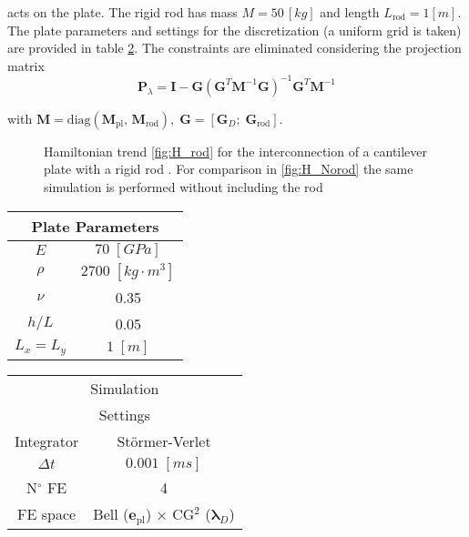 \documentclass[letterpaper, 10 pt, conference]{ieeeconf}
\begin{document}
acts on the plate. The rigid rod has mass $M = 50 \, [kg]$ and length $L_{\text{rod}} = 1 [m]$. The plate parameters and settings for the discretization (a uniform grid is taken) are provided in table \ref{tab:par}. The constraints are eliminated considering the projection matrix \cite{Heiland_red}
\begin{equation} \label{eq:proj}
\bm{P}_{\lambda} = \bm{I} - \bm{G} \left(\bm{G}^T \bm{M}^{-1} \bm{G} \right)^{-1} \bm{G}^T \bm{M}^{-1}
\end{equation}
 
with $\bm{M} = \text{diag}(\bm{M}_{\text{pl}}, \, \bm{M}_{\text{rod}}), \; \bm{G} = [\bm{G}_D; \; \bm{G}_{\text{rod}}]$.

\begin{figure}[t]
\centering
{}
\hfil
{}
\caption{Hamiltonian trend \ref{fig:H_rod} for the interconnection of a cantilever plate with a rigid rod . For comparison in \ref{fig:H_Norod} the same simulation is performed without including the rod}
\label{fig:HamInt}
\end{figure}

\begin{table}[t]
	\centering
	\begin{tabular}{|c|c|}
		\hline 
		\multicolumn{2}{|c|}{Plate Parameters} \\ 
		\hline 
		$E$ & $70\; [GPa]$ \\ 
		$\rho$ & $2700\; [kg \cdot m^3]$ \\ 
		$\nu$& 0.35 \\ 
		$h/L$& 0.05 \\ 
		$L_x = L_y$& $1\; [m]$\\ 
		\hline 
	\end{tabular} 
	\begin{tabular}{|c|c|}
		\hline 
		\multicolumn{2}{|c|}{Simulation} \\ 
		\multicolumn{2}{|c|}{Settings} \\
		\hline 
		Integrator & St\"ormer-Verlet \\
		$\Delta t $ & $0.001 \; [ms]$ \\  
		N$^\circ$ FE & 4 \\
		FE space & Bell ($\bm{e}_{\text{pl}}$) $\times$ CG$^2$ ($\bm{\lambda}_D$)\\
		\hline 
	\end{tabular} 
	\captionsetup{width=0.95\linewidth}
	\vspace{1mm}
	\label{tab:par}
\end{table}
\end{document}
